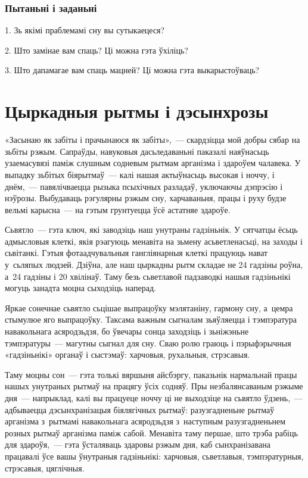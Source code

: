 \subsubsection{Пытаньні і заданьні}

1. Зь якімі праблемамі сну вы сутыкаецеся?

2. Што замінае вам спаць? Ці можна гэта ўхіліць?

3. Што дапамагае вам спаць мацней? Ці можна гэта выкарыстоўваць?


\section{Цыркадныя рытмы і дэсынхрозы}

«Засынаю як забіты і прачынаюся як забіты»,~--- скардзіцца мой добры сябар на зьбіты рэжым. Сапраўды, навуковыя дасьледаваньні паказалі наяўнасьць узаемасувязі паміж слушным содневым рытмам арганізма і здароўем чалавека. У выпадку зьбітых біярытмаў~--- калі нашая актыўнасьць высокая і ноччу, і днём,~--- павялічваецца рызыка псыхічных разладаў, уключаючы дэпрэсію і нэўрозы. Выбудаваць рэгулярны рэжым сну, харчаваньня, працы і руху будзе вельмі карысна~--- на гэтым грунтуецца ўсё астатняе здароўе.

Сьвятло~--- гэта ключ, які заводзіць наш унутраны гадзіньнік. У сятчатцы ёсьць адмысловыя клеткі, якія рэагуюць менавіта на зьмену асьветленасьці, на заходы і сьвітанкі. Гэтыя фотаадчувальныя гангліянарныя клеткі працуюць нават у~сьляпых людзей. Дзіўна, але наш цыркадны рытм складае не 24 гадзіны роўна, а~24 гадзіны і 20 хвілінаў. Таму безь сьветлавой падзаводкі нашыя гадзіньнікі могуць занадта моцна сыходзіць наперад.

Яркае сонечнае сьвятло сьцішае выпрацоўку мэлятаніну, гармону сну, а~цемра стымулюе яго выпрацоўку. Таксама важным сыгналам зьяўляецца і тэмпэратура навакольнага асяродзьдзя, бо ўвечары сонца заходзіць і зьніжэньне тэмпэратуры~--- магутны сыгнал для сну. Сваю ролю граюць і пэрыфэрычныя «гадзіньнікі» органаў і сыстэмаў: харчовыя, рухальныя, стрэсавыя.

Таму моцны сон~--- гэта толькі вяршыня айсбэргу, паказьнік нармальнай працы нашых унутраных рытмаў на працягу ўсіх содняў. Пры незбалянсаваным рэжыме дня~--- напрыклад, калі вы працуеце ноччу ці не выходзіце на сьвятло ўдзень,~--- адбываецца дэсынхранізацыя біялягічных рытмаў: разузгадненьне рытмаў арганізма з~рытмамі навакольнага асяродзьдзя з~наступным разузгадненьнем розных рытмаў арганізма паміж сабой. Менавіта таму першае, што трэба рабіць для здароўя,~--- гэта ўсталяваць здаровы рэжым дня, каб сынхранізавана працавалі ўсе вашы ўнутраныя гадзіньнікі: харчовыя, сьветлавыя, тэмпэратурныя, стрэсавыя, цяглічныя.

